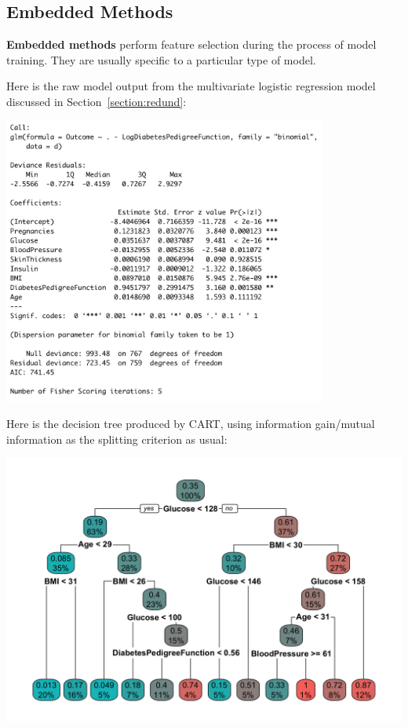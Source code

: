 \newpage

\subsection{Embedded Methods}

\textbf{Embedded methods} perform feature selection during the process of model training. They are usually specific to a particular type of model. 

\begin{question}{}
Here is the raw model output from the multivariate logistic regression model discussed in Section~\ref{section:redund}:
\begin{center}
\includegraphics[width=0.8\textwidth]{img/cor-example-multivar.png}
\end{center}
\end{question}

\begin{question}{}
Here is the decision tree produced by CART, using information gain/mutual information as the splitting criterion as usual:
\begin{center}
\includegraphics[width=\textwidth]{img/pima-decision-tree.png}
\end{center}
\end{question}

